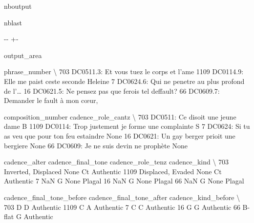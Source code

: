 \documentclass[letterpaper,10pt,english]{sphinxmanual}
\newlength\nbsphinxcodecellspacing
\begin{document}
\begin{sphinxuseclass}{nboutput}
\begin{sphinxuseclass}{nblast}
{

\kern-\sphinxverbatimsmallskipamount\kern-\baselineskip
\kern+\FrameHeightAdjust\kern-\fboxrule
\vspace{\nbsphinxcodecellspacing}

\begin{sphinxuseclass}{output_area}
\begin{sphinxuseclass}{}


\begin{sphinxVerbatim}[commandchars=\\\{\}]
\llap{\color{nbsphinxout}[23]:\,\hspace{\fboxrule}\hspace{\fboxsep}}                                          phrase\_number  \textbackslash{}
703            DC0511.3: Et vous tuez le corps et l’ame
1109      DC0114.9: Elle me paist ceste seconde Heleine
7     DC0624.6: Qui ne penetre au plus profond de l'{\ldots}
16     DC0621.5: Ne pensez pas que ferois tel deffault?
66              DC0609.7: Demander le fault à mon cœur,

                                   composition\_number cadence\_role\_cantz  \textbackslash{}
703                  DC0511: Ce disoit une jeune dame                  B
1109   DC0114: Trop justement je forme une complainte                  S
7     DC0624: Si tu as veu que pour ton feu estaindre               None
16          DC0621: Un gay berger prioit une bergiere               None
66               DC0609: Je ne suis devin ne prophète               None

            cadence\_alter cadence\_final\_tone cadence\_role\_tenz cadence\_kind  \textbackslash{}
703   Inverted, Displaced               None                Ct    Authentic
1109    Displaced, Evaded               None                Ct    Authentic
7                     NaN                  G              None       Plagal
16                    NaN                  G              None       Plagal
66                    NaN                  G              None       Plagal

     cadence\_final\_tone\_before cadence\_final\_tone\_after cadence\_kind\_before  \textbackslash{}
703                          D                        D           Authentic
1109                         C                        A           Authentic
7                            C                        C           Authentic
16                           G                        G           Authentic
66                      B-flat                        G           Authentic


\end{sphinxVerbatim}
\end{sphinxuseclass}
\end{sphinxuseclass}}
\end{sphinxuseclass}
\end{sphinxuseclass}
\end{document}
